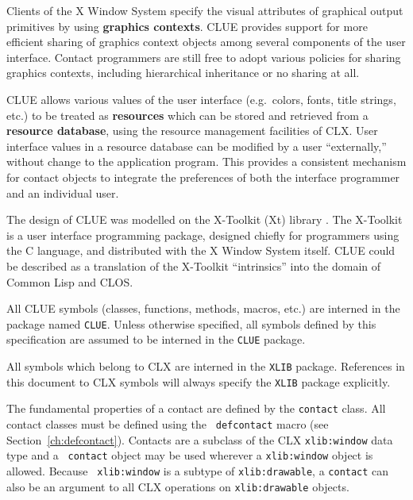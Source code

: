 Clients of the X Window System
specify the visual attributes of graphical output primitives by using
{\bf graphics contexts}.
CLUE provides support for more efficient sharing of graphics context
objects among several components of the user interface.  Contact
programmers are still free to adopt various policies for sharing
graphics contexts, including hierarchical inheritance or no sharing at
all.

CLUE allows various values of
the
user interface (e.g.\ colors, fonts, title strings, etc.) to be treated as {\bf
resources} which can be stored and retrieved from  a {\bf resource
database}, using the resource management facilities of
CLX.  User interface values in a resource database can be modified
by a user ``externally,'' without change to the application program.
This provides a consistent mechanism for
contact objects to integrate the preferences of both the interface
programmer and an individual user.


The design of CLUE was modelled on the 
X-Toolkit (Xt) library
\cite{Xt}.
The X-Toolkit is a user interface programming package, designed chiefly for
programmers using the C language, and distributed with the X Window
System itself.  CLUE could be described as a translation of the X-Toolkit
``intrinsics'' into the domain of Common Lisp and CLOS.


All CLUE symbols (classes, functions, methods, macros, etc.) are interned in 
the package named {\tt CLUE}. Unless otherwise specified, all symbols defined by 
this specification are assumed to be interned in the {\tt CLUE} package.

All symbols which belong to CLX are interned in the {\tt XLIB} package.
References in this document to CLX symbols will always specify the {\tt XLIB}
package explicitly.






The fundamental properties of a contact are defined by the {\tt contact} class.
All contact classes must be defined using the {\tt
defcontact} macro (see Section~\ref{ch:defcontact}).
Contacts are a subclass of the CLX {\tt xlib:window} data type and a {\tt
contact}
object may be used wherever a {\tt xlib:window} object is allowed. Because {\tt
xlib:window} is a subtype of {\tt xlib:drawable}, a {\tt contact} can also be an
argument to all CLX operations on {\tt xlib:drawable} objects.


